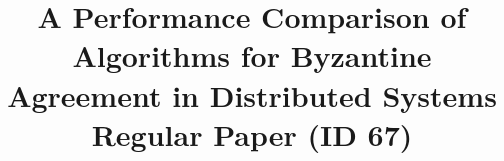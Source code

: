 \title{A Performance Comparison of Algorithms for Byzantine Agreement in Distributed Systems \\ {\large Regular Paper (ID 67)} \vspace{-5mm}}


%

\maketitle


